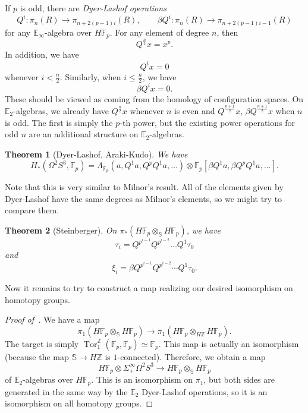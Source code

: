 \documentclass[10pt, oneside]{memoir}
\newtheorem{thm}{Theorem}[subsection]
\theoremstyle{definition}
\theoremstyle{remark}
\theoremstyle{plain}
\theoremstyle{definition}
\theoremstyle{remark}
\newcommand{\Z}{\mathbb{Z}}
\newcommand{\E}{\mathbb{E}}
\newcommand{\F}{\mathbb{F}}
\newcommand{\bS}{\mathbb{S}}
\newcommand{\1}{\mathbf{1}}
\newcommand{\2}{\mathbf{2}}
\newcommand{\3}{\mathbf{3}}
\DeclareMathOperator{\Tor}{Tor}
\begin{document}
If \(p \) is odd, there are \textit{Dyer-Lashof operations}
\[ Q^i \colon \pi_n(R) \to \pi_{n+2(p-1)i}(R), \qquad \beta Q^i \colon \pi_n(R) \to \pi_{n+2(p-1)i-1}(R) \]
for any \(\E_{\infty} \)-algebra over \(H \F_p \). For any element of degree \(n \), then
\[ Q^{\frac{n}{2}} x = x^p. \]
In addition, we have
\[ Q^i x = 0 \]
whenever \(i < \frac{n}{2} \). Similarly, when \(i \leq \frac{n}{2} \), we have
\[ \beta Q^i x = 0. \]
These should be viewed as coming from the homology of configuration spaces. On \(\E_2 \)-algebras, we already have \(Q^{\frac{n}{2}} x \)
whenever \(n \) is even and \(Q^{\frac{n+1}{2}}x \), \(\beta Q^{\frac{n+1}{2}}x \) when \(n \) is odd. The first is simply the \(p \)-th power, but the existing power operations for odd \(n \) are an additional structure on \(\E_2 \)-algebras.

\begin{thm}[Dyer-Lashof, Araki-Kudo]
    We have
    \[ H_*(\Omega^2 S^3, \F_p) = \Lambda_{\F_p} (a, Q^1 a, Q^p Q^1 a, \ldots) \otimes \F_p[\beta Q^1 a, \beta Q^p Q^1 a, \ldots]. \]
\end{thm}

Note that this is very similar to Milnor's result. All of the elements given by Dyer-Lashof have the same degrees as Milnor's elements, so we might try to compare them.

\begin{thm}[Steinberger]
    On \(\pi_* (H \F_p \otimes_{\bS} H \F_p) \), we have
    \[ \tau_i = Q^{p^{i-1}} Q^{p^{i-2}} \dots Q^1 \tau_0 \]
    and
    \[ \xi_i = \beta Q^{p^{i-1}} Q^{p^{i-2}} \cdots Q^1 \tau_0. \]
\end{thm}

Now it remains to try to construct a map realizing our desired isomorphism on homotopy groups.

\begin{proof}[Proof of~]
    We have a map
    \[ \pi_1 (H \F_p \otimes_{\bS} H \F_p) \to \pi_1 (H \F_p \otimes_{H \Z} H \F_p). \]
    The target is simply \(\Tor_1^{\Z}(\F_p, \F_p) \simeq \F_p \). This map is actually an isomorphism (because the map \(\bS \to H \Z \) is \(1 \)-connected). Therefore, we obtain a map
    \[ H \F_p \otimes \Sigma_+^{\infty} \Omega^2 S^3 \to H \F_p \otimes_{\bS} H \F_p \]
    of \(\E_2 \)-algebras over \(H \F_p \). This is an isomorphism on \(\pi_1 \), but both sides are generated in the same way by the \(\E_2 \) Dyer-Lashof operations, so it is an isomorphism on all homotopy groups.
\end{proof}
\end{document}
